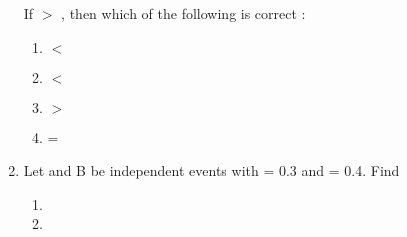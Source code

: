 \begin{enumerate}[label=\thesection.\arabic*,ref=\thesection.\theenumi]
 If  $>$ , then which of the following is correct :

\begin{enumerate}[label=(\Alph*)]

 \item  
 \label{12.13.6.18.A}
  $<$ \\
 \item 
  \label{12.13.6.18.B}
  $<$ \\
 \item 
 \label{12.13.6.18.C}
  $>$ \\
 \item 
  \label{12.13.6.18.D}
  = \\

 \end{enumerate}
%
\item Let  and B be independent events with  = 0.3 and  = 0.4. Find 
\begin{enumerate}
\item {} \item {}


\end{enumerate}
\end{enumerate}
